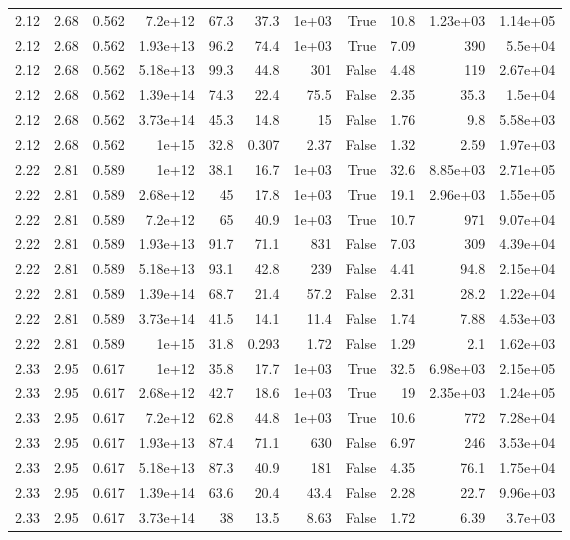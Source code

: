 \begin{table}
\begin{tabular}{rrrrrrrrrrr}
2.12 & 2.68 & 0.562 & 7.2e+12 & 67.3 & 37.3 & 1e+03 & True & 10.8 & 1.23e+03 & 1.14e+05 \\
2.12 & 2.68 & 0.562 & 1.93e+13 & 96.2 & 74.4 & 1e+03 & True & 7.09 & 390 & 5.5e+04 \\
2.12 & 2.68 & 0.562 & 5.18e+13 & 99.3 & 44.8 & 301 & False & 4.48 & 119 & 2.67e+04 \\
2.12 & 2.68 & 0.562 & 1.39e+14 & 74.3 & 22.4 & 75.5 & False & 2.35 & 35.3 & 1.5e+04 \\
2.12 & 2.68 & 0.562 & 3.73e+14 & 45.3 & 14.8 & 15 & False & 1.76 & 9.8 & 5.58e+03 \\
2.12 & 2.68 & 0.562 & 1e+15 & 32.8 & 0.307 & 2.37 & False & 1.32 & 2.59 & 1.97e+03 \\
2.22 & 2.81 & 0.589 & 1e+12 & 38.1 & 16.7 & 1e+03 & True & 32.6 & 8.85e+03 & 2.71e+05 \\
2.22 & 2.81 & 0.589 & 2.68e+12 & 45 & 17.8 & 1e+03 & True & 19.1 & 2.96e+03 & 1.55e+05 \\
2.22 & 2.81 & 0.589 & 7.2e+12 & 65 & 40.9 & 1e+03 & True & 10.7 & 971 & 9.07e+04 \\
2.22 & 2.81 & 0.589 & 1.93e+13 & 91.7 & 71.1 & 831 & False & 7.03 & 309 & 4.39e+04 \\
2.22 & 2.81 & 0.589 & 5.18e+13 & 93.1 & 42.8 & 239 & False & 4.41 & 94.8 & 2.15e+04 \\
2.22 & 2.81 & 0.589 & 1.39e+14 & 68.7 & 21.4 & 57.2 & False & 2.31 & 28.2 & 1.22e+04 \\
2.22 & 2.81 & 0.589 & 3.73e+14 & 41.5 & 14.1 & 11.4 & False & 1.74 & 7.88 & 4.53e+03 \\
2.22 & 2.81 & 0.589 & 1e+15 & 31.8 & 0.293 & 1.72 & False & 1.29 & 2.1 & 1.62e+03 \\
2.33 & 2.95 & 0.617 & 1e+12 & 35.8 & 17.7 & 1e+03 & True & 32.5 & 6.98e+03 & 2.15e+05 \\
2.33 & 2.95 & 0.617 & 2.68e+12 & 42.7 & 18.6 & 1e+03 & True & 19 & 2.35e+03 & 1.24e+05 \\
2.33 & 2.95 & 0.617 & 7.2e+12 & 62.8 & 44.8 & 1e+03 & True & 10.6 & 772 & 7.28e+04 \\
2.33 & 2.95 & 0.617 & 1.93e+13 & 87.4 & 71.1 & 630 & False & 6.97 & 246 & 3.53e+04 \\
2.33 & 2.95 & 0.617 & 5.18e+13 & 87.3 & 40.9 & 181 & False & 4.35 & 76.1 & 1.75e+04 \\
2.33 & 2.95 & 0.617 & 1.39e+14 & 63.6 & 20.4 & 43.4 & False & 2.28 & 22.7 & 9.96e+03 \\
2.33 & 2.95 & 0.617 & 3.73e+14 & 38 & 13.5 & 8.63 & False & 1.72 & 6.39 & 3.7e+03 \\

\end{tabular}
\end{table}
